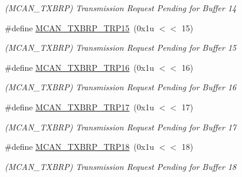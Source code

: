 \begin{DoxyCompactItemize}
\begin{DoxyCompactList}\small\item\em (M\+C\+A\+N\+\_\+\+T\+X\+B\+RP) Transmission Request Pending for Buffer 14 \end{DoxyCompactList}\item 
\mbox{\label{group__SAME70__MCAN_gae52139842401a6e4cfcf388af72c98d9}} 
\#define \mbox{\hyperlink{group__SAME70__MCAN_gae52139842401a6e4cfcf388af72c98d9}{M\+C\+A\+N\+\_\+\+T\+X\+B\+R\+P\+\_\+\+T\+R\+P15}}~(0x1u $<$$<$ 15)
\begin{DoxyCompactList}\small\item\em (M\+C\+A\+N\+\_\+\+T\+X\+B\+RP) Transmission Request Pending for Buffer 15 \end{DoxyCompactList}\item 
\mbox{\label{group__SAME70__MCAN_gafe3133d34827ff52644ec5bb992e6219}} 
\#define \mbox{\hyperlink{group__SAME70__MCAN_gafe3133d34827ff52644ec5bb992e6219}{M\+C\+A\+N\+\_\+\+T\+X\+B\+R\+P\+\_\+\+T\+R\+P16}}~(0x1u $<$$<$ 16)
\begin{DoxyCompactList}\small\item\em (M\+C\+A\+N\+\_\+\+T\+X\+B\+RP) Transmission Request Pending for Buffer 16 \end{DoxyCompactList}\item 
\mbox{\label{group__SAME70__MCAN_ga5f584fb4c2069139ec3bd70e2478e911}} 
\#define \mbox{\hyperlink{group__SAME70__MCAN_ga5f584fb4c2069139ec3bd70e2478e911}{M\+C\+A\+N\+\_\+\+T\+X\+B\+R\+P\+\_\+\+T\+R\+P17}}~(0x1u $<$$<$ 17)
\begin{DoxyCompactList}\small\item\em (M\+C\+A\+N\+\_\+\+T\+X\+B\+RP) Transmission Request Pending for Buffer 17 \end{DoxyCompactList}\item 
\mbox{\label{group__SAME70__MCAN_gae57de9c0dc66f788c6c94830bf57ebdb}} 
\#define \mbox{\hyperlink{group__SAME70__MCAN_gae57de9c0dc66f788c6c94830bf57ebdb}{M\+C\+A\+N\+\_\+\+T\+X\+B\+R\+P\+\_\+\+T\+R\+P18}}~(0x1u $<$$<$ 18)
\begin{DoxyCompactList}\small\item\em (M\+C\+A\+N\+\_\+\+T\+X\+B\+RP) Transmission Request Pending for Buffer 18 \end{DoxyCompactList}\item 

\end{DoxyCompactItemize}
